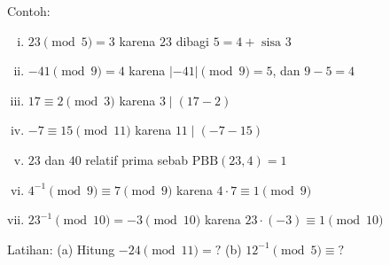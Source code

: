 \documentclass{article}
\begin{document}

Contoh:
\begin{enumerate}[(i)]
  \item $23 \pmod{5} = 3$ karena $23$ dibagi $5 = 4 + \text{ sisa } 3$
  \item $-41 \pmod{9} = 4$ karena $|-41| \pmod{9} = 5$, dan $9 - 5 = 4$
  \item $17 \equiv 2 \pmod{3}$ karena $3 \mid (17 - 2)$
  \item $-7 \equiv 15 \pmod{11}$ karena $11 \mid (-7 - 15)$
  \item $23$ dan $40$ relatif prima sebab $\text{PBB}(23, 4) = 1$
  \item $4^{-1} \pmod{9} \equiv 7 \pmod{9}$ karena $4 \cdot 7 \equiv 1 \pmod{9}$
  \item $23^{-1} \pmod{10} = -3 \pmod{10}$ karena $23 \cdot (-3) \equiv 1 \pmod{10}$
\end{enumerate}

Latihan: (a) Hitung $-24 \pmod{11} = ?$
(b) $12^{-1} \pmod{5} \equiv ?$
\end{document}
